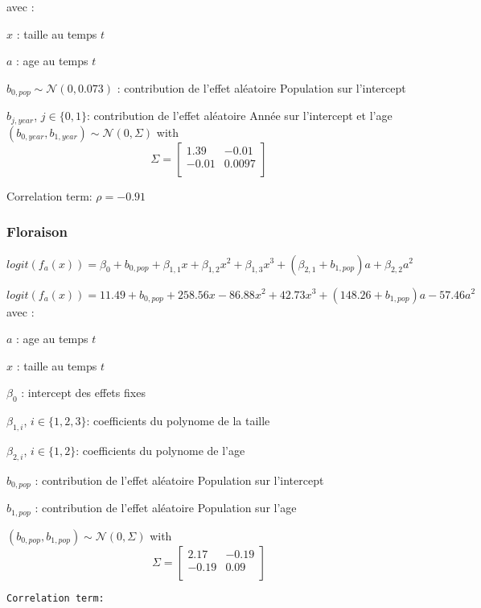 \documentclass[
]{article}
\begin{document}
avec :

\(x\) : taille au temps \(t\)

\(a\) : age au temps \(t\)

\(b_{0,pop} \sim \mathcal{N}(0,0.073)\) : contribution de l'effet
aléatoire Population sur l'intercept

\(b_{j,year}\), \(j\in\{0,1\}\): contribution de l'effet aléatoire Année
sur l'intercept et l'age
\((b_{0,year},b_{1,year}) \sim \mathcal{N}(0,\Sigma)\) with \[\Sigma =
  \left[ {\begin{array}{cc}
    1.39 & -0.01 \\
    -0.01 & 0.0097 \\
  \end{array} } \right]\]

Correlation term: \(\rho=-0.91\)

\subsubsection{Floraison}\label{floraison}

\[logit(f_a(x))=\beta_0+b_{0,pop}+\beta_{1,1}x+\beta_{1,2}x^2+\beta_{1,3}x^3+(\beta_{2,1}+b_{1,pop})a+\beta_{2,2}a^2\]

\[logit(f_a(x))=11.49+b_{0,pop}+258.56x-86.88x^2+42.73x^3+(148.26+b_{1,pop})a-57.46a^2\]
avec :

\(a\) : age au temps \(t\)

\(x\) : taille au temps \(t\)

\(\beta_0\) : intercept des effets fixes

\(\beta_{1,i}\), \(i\in\{1,2,3\}\): coefficients du polynome de la
taille

\(\beta_{2,i}\), \(i\in\{1,2\}\): coefficients du polynome de l'age

\(b_{0,pop}\) : contribution de l'effet aléatoire Population sur
l'intercept

\(b_{1,pop}\) : contribution de l'effet aléatoire Population sur l'age

\((b_{0,pop},b_{1,pop}) \sim \mathcal{N}(0,\Sigma)\) with \[\Sigma =
  \left[ {\begin{array}{cc}
    2.17 & -0.19 \\
    -0.19 & 0.09 \\
  \end{array} } \right]\]

\begin{verbatim}
Correlation term:
\end{verbatim}
\end{document}
